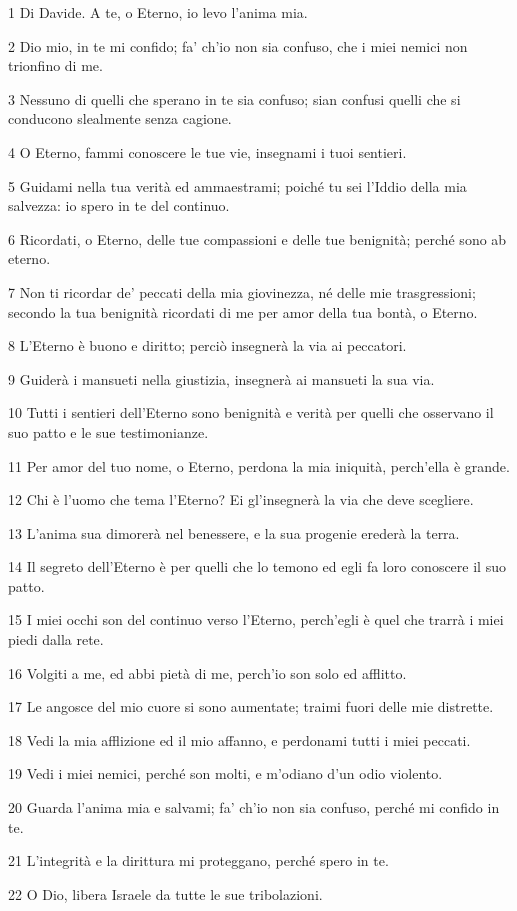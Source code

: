 \par 1 Di Davide. A te, o Eterno, io levo l'anima mia.
\par 2 Dio mio, in te mi confido; fa' ch'io non sia confuso, che i miei nemici non trionfino di me.
\par 3 Nessuno di quelli che sperano in te sia confuso; sian confusi quelli che si conducono slealmente senza cagione.
\par 4 O Eterno, fammi conoscere le tue vie, insegnami i tuoi sentieri.
\par 5 Guidami nella tua verità ed ammaestrami; poiché tu sei l'Iddio della mia salvezza: io spero in te del continuo.
\par 6 Ricordati, o Eterno, delle tue compassioni e delle tue benignità; perché sono ab eterno.
\par 7 Non ti ricordar de' peccati della mia giovinezza, né delle mie trasgressioni; secondo la tua benignità ricordati di me per amor della tua bontà, o Eterno.
\par 8 L'Eterno è buono e diritto; perciò insegnerà la via ai peccatori.
\par 9 Guiderà i mansueti nella giustizia, insegnerà ai mansueti la sua via.
\par 10 Tutti i sentieri dell'Eterno sono benignità e verità per quelli che osservano il suo patto e le sue testimonianze.
\par 11 Per amor del tuo nome, o Eterno, perdona la mia iniquità, perch'ella è grande.
\par 12 Chi è l'uomo che tema l'Eterno? Ei gl'insegnerà la via che deve scegliere.
\par 13 L'anima sua dimorerà nel benessere, e la sua progenie erederà la terra.
\par 14 Il segreto dell'Eterno è per quelli che lo temono ed egli fa loro conoscere il suo patto.
\par 15 I miei occhi son del continuo verso l'Eterno, perch'egli è quel che trarrà i miei piedi dalla rete.
\par 16 Volgiti a me, ed abbi pietà di me, perch'io son solo ed afflitto.
\par 17 Le angosce del mio cuore si sono aumentate; traimi fuori delle mie distrette.
\par 18 Vedi la mia afflizione ed il mio affanno, e perdonami tutti i miei peccati.
\par 19 Vedi i miei nemici, perché son molti, e m'odiano d'un odio violento.
\par 20 Guarda l'anima mia e salvami; fa' ch'io non sia confuso, perché mi confido in te.
\par 21 L'integrità e la dirittura mi proteggano, perché spero in te.
\par 22 O Dio, libera Israele da tutte le sue tribolazioni.

